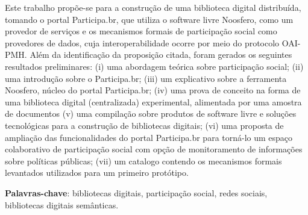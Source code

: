 \begin{resumo}

Este trabalho propõe-se para a construção de uma biblioteca digital distribuída, tomando o portal Participa.br, que utiliza o software livre Noosfero, como um provedor de serviços e os mecanismos formais de participação social como provedores de dados, cuja interoperabilidade ocorre por meio do protocolo OAI-PMH. Além da identificação da proposição citada, foram gerados os seguintes resultados preliminares: (i) uma abordagem teórica sobre participação social; (ii) uma introdução sobre o Participa.br; (iii) um explicativo sobre a ferramenta Noosfero, núcleo do portal Participa.br; (iv) uma prova de conceito na forma de uma biblioteca digital (centralizada) experimental, alimentada por uma amostra de documentos (v) uma compilação sobre produtos de software livre e soluções tecnológicas para a construção de bibliotecas digitais; (vi) uma proposta de ampliação das funcionalidades do portal Participa.br para torná-lo um espaço colaborativo de participação social com opção de monitoramento de informações sobre políticas públicas; (vii) um catalogo contendo os mecanismos formais levantados utilizados para um primeiro protótipo.


\textbf{Palavras-chave}: bibliotecas digitais, participação social, redes sociais, bibliotecas digitais semânticas.

\end{resumo}
